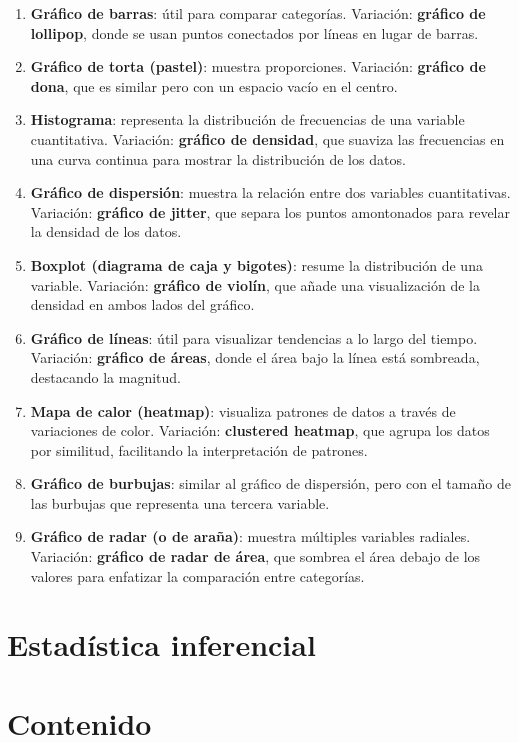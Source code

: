 \documentclass[
  letterpaper,
  DIV=11,
  numbers=noendperiod]{scrreprt}
\begin{document}
\begin{enumerate}
\def\labelenumi{\arabic{enumi}.}
\item
  \textbf{Gráfico de barras}: útil para comparar categorías. Variación:
  \textbf{gráfico de lollipop}, donde se usan puntos conectados por
  líneas en lugar de barras.
\item
  \textbf{Gráfico de torta (pastel)}: muestra proporciones. Variación:
  \textbf{gráfico de dona}, que es similar pero con un espacio vacío en
  el centro.
\item
  \textbf{Histograma}: representa la distribución de frecuencias de una
  variable cuantitativa. Variación: \textbf{gráfico de densidad}, que
  suaviza las frecuencias en una curva continua para mostrar la
  distribución de los datos.
\item
  \textbf{Gráfico de dispersión}: muestra la relación entre dos
  variables cuantitativas. Variación: \textbf{gráfico de jitter}, que
  separa los puntos amontonados para revelar la densidad de los datos.
\item
  \textbf{Boxplot (diagrama de caja y bigotes)}: resume la distribución
  de una variable. Variación: \textbf{gráfico de violín}, que añade una
  visualización de la densidad en ambos lados del gráfico.
\item
  \textbf{Gráfico de líneas}: útil para visualizar tendencias a lo largo
  del tiempo. Variación: \textbf{gráfico de áreas}, donde el área bajo
  la línea está sombreada, destacando la magnitud.
\item
  \textbf{Mapa de calor (heatmap)}: visualiza patrones de datos a través
  de variaciones de color. Variación: \textbf{clustered heatmap}, que
  agrupa los datos por similitud, facilitando la interpretación de
  patrones.
\item
  \textbf{Gráfico de burbujas}: similar al gráfico de dispersión, pero
  con el tamaño de las burbujas que representa una tercera variable.
\item
  \textbf{Gráfico de radar (o de araña)}: muestra múltiples variables
  radiales. Variación: \textbf{gráfico de radar de área}, que sombrea el
  área debajo de los valores para enfatizar la comparación entre
  categorías.
\end{enumerate}

\part{Estadística inferencial}

\part{Contenido}
\end{document}
